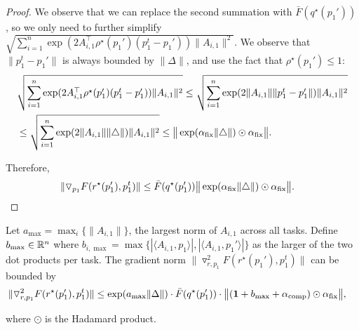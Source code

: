 \begin{proof}
We observe that we can replace the second summation with $\bar{F}(q^\star(p_1'))$, so we only need to further simplify $\sqrt{\sum_{i = 1}^n \exp(2 A_{i, 1}^\top \rho^\star(p_1') (p_1^t - p_1'))  \| A_{i, 1} \|^2}$. We observe that $\|p_1^t - p_1'\|$ is always bounded by $\|\Delta\|$, and use the fact that $\rho^\star(p_1') \le 1$:
\begin{align*}
    & \sqrt{\sum_{i = 1}^n \exp(2 A_{i, 1}^\top \rho^\star(p_1') (p_1^t - p_1'))  \| A_{i, 1} \|^2} \le \sqrt{\sum_{i = 1}^n \exp(2 \|A_{i, 1} \| \|p_1^t - p_1' \|)  \| A_{i, 1} \|^2} \\
    &\le \sqrt{\sum_{i = 1}^n \exp(2 \|A_{i, 1} \| \|\triangle \|)  \| A_{i, 1} \|^2} \le \big\|  \exp( \alpha_{\text{fix}} \|\triangle \|) \odot \alpha_{\text{fix}}   \big\|.
\end{align*}

Therefore,
\begin{align*}
    &\|\triangledown_{p_1} F(r^\star(p_1'), p_1^t)\| \le  \bar{F}(q^\star(p_1'))  \big\|  \exp( \alpha_{\text{fix}} \|\triangle \|) \odot \alpha_{\text{fix}}  \big\|.
\end{align*}
\end{proof}


\begin{lemma}\label{lemma:grad_r_p_1}
Let $a_{\max} = \max_i \{ \|A_{i, 1}\|\}$, the largest norm of $A_{i, 1}$ across all tasks. Define $b_{\max} \in \mathbb{R}^n$ where $b_{i, \max} = \max\{ |\langle A_{i, 1}, p_1 \rangle|, |\langle A_{i, 1}, p_1' \rangle| \}$ as the larger of the two dot products per task.  The gradient norm $\|\triangledown^2_{r,p_1}F(r^\star(p_1'),p_1^t)\|$ can be bounded by 
    \begin{align*}
\|\triangledown^2_{r,p_1}F(r^\star(p_1'),p_1^t)\| &\le\exp( a_{\max} \| \Delta \| ) \cdot  \bar{F}(q^\star(p_1')) \cdot \big\| (\mathbf{1} + b_{\max} + \alpha_{\text{comp}}) \odot \alpha_{\text{fix}} \big\|,
    \end{align*}
    
where $\odot$ is the Hadamard product.
\end{lemma}

